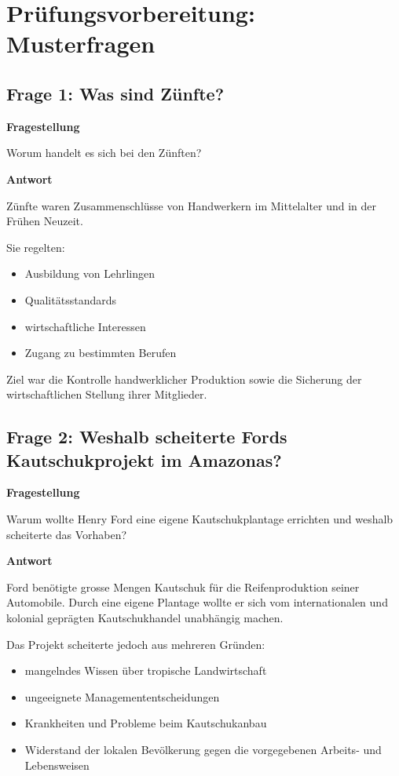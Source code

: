 \section{Prüfungsvorbereitung: Musterfragen}

\subsection{Frage 1: Was sind Zünfte?}

\textbf{Fragestellung}

Worum handelt es sich bei den Zünften?

\textbf{Antwort}

Zünfte waren Zusammenschlüsse von Handwerkern im Mittelalter und in der Frühen Neuzeit.

Sie regelten:

\begin{itemize}
\item Ausbildung von Lehrlingen
\item Qualitätsstandards
\item wirtschaftliche Interessen
\item Zugang zu bestimmten Berufen
\end{itemize}

Ziel war die Kontrolle handwerklicher Produktion sowie die Sicherung der wirtschaftlichen Stellung ihrer Mitglieder.

\subsection{Frage 2: Weshalb scheiterte Fords Kautschukprojekt im Amazonas?}

\textbf{Fragestellung}

Warum wollte Henry Ford eine eigene Kautschukplantage errichten und weshalb scheiterte das Vorhaben?

\textbf{Antwort}

Ford benötigte grosse Mengen Kautschuk für die Reifenproduktion seiner Automobile. Durch eine eigene Plantage wollte er sich vom internationalen und kolonial geprägten Kautschukhandel unabhängig machen.

Das Projekt scheiterte jedoch aus mehreren Gründen:

\begin{itemize}
\item mangelndes Wissen über tropische Landwirtschaft
\item ungeeignete Managemententscheidungen
\item Krankheiten und Probleme beim Kautschukanbau
\item Widerstand der lokalen Bevölkerung gegen die vorgegebenen Arbeits- und Lebensweisen
\end{itemize}

